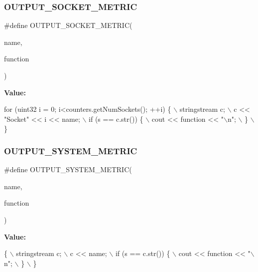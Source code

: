 \subsubsection{O\+U\+T\+P\+U\+T\+\_\+\+S\+O\+C\+K\+E\+T\+\_\+\+M\+E\+T\+R\+IC}
{\footnotesize\ttfamily \#define O\+U\+T\+P\+U\+T\+\_\+\+S\+O\+C\+K\+E\+T\+\_\+\+M\+E\+T\+R\+IC(\begin{DoxyParamCaption}\item[{}]{name,  }\item[{}]{function }\end{DoxyParamCaption})}

{\bfseries Value\+:}
\begin{DoxyCode}
\textcolor{keywordflow}{for} (uint32 i = 0; i<counters.getNumSockets(); ++i) \{ \(\backslash\)
                             stringstream c; \(\backslash\)
                             c << \textcolor{stringliteral}{"Socket"} << i << name; \(\backslash\)
                             if (s == c.str()) \{ \(\backslash\)
                                 cout << \textcolor{keyword}{function} << \textcolor{stringliteral}{"\(\backslash\)n"}; \(\backslash\)
                             \} \(\backslash\)
                         \}
\end{DoxyCode}
\mbox{\label{pcm-sensor_8cpp_a726c566daab6b237bf1c8d3776efdd40}} 
\subsubsection{O\+U\+T\+P\+U\+T\+\_\+\+S\+Y\+S\+T\+E\+M\+\_\+\+M\+E\+T\+R\+IC}
{\footnotesize\ttfamily \#define O\+U\+T\+P\+U\+T\+\_\+\+S\+Y\+S\+T\+E\+M\+\_\+\+M\+E\+T\+R\+IC(\begin{DoxyParamCaption}\item[{}]{name,  }\item[{}]{function }\end{DoxyParamCaption})}

{\bfseries Value\+:}
\begin{DoxyCode}
\{ \(\backslash\)
        stringstream c; \(\backslash\)
        c << name; \(\backslash\)
        if (s == c.str()) \{ \(\backslash\)
            cout << \textcolor{keyword}{function} << \textcolor{stringliteral}{"\(\backslash\)n"}; \(\backslash\)
        \} \(\backslash\)
    \}
\end{DoxyCode}
